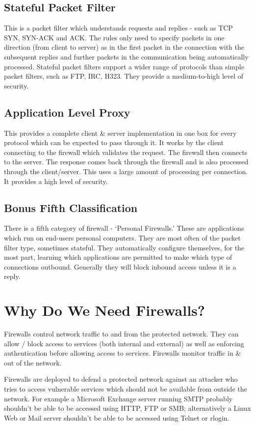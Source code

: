 \subsection{Stateful Packet Filter}
This is a packet filter which understands requests and replies - such as TCP SYN, SYN-ACK and ACK. The rules only need to specify packets in one direction (from client to server) as in the first packet in the connection with the subsequent replies and further packets in the communication being automatically processed. Stateful packet filters support a wider range of protocols than simple packet filters, such as FTP, IRC, H323. They provide a medium-to-high level of security.

\subsection{Application Level Proxy}
This provides a complete client \& server implementation in one box for every protocol which can be expected to pass through it. It works by the client connecting to the firewall which validates the request. The firewall then connects to the server. The response comes back through the firewall and is also processed through the client/server. This uses a large amount of processing per connection. It provides a high level of security. 

\subsection{Bonus Fifth Classification}
There is a fifth category of firewall - `Personal Firewalls.' These are applications which run on end-users personal computers. They are most often of the packet filter type, sometimes stateful. They automatically configure themselves, for the most part, learning which applications are permitted to make which type of connections outbound. Generally they will block inbound access unless it is a reply. 

\section{Why Do We Need Firewalls?}
Firewalls control network traffic to and from the protected network. They can allow / block access to services (both internal and external) as well as enforcing authentication before allowing access to services. Firewalls monitor traffic in \& out of the network.

Firewalls are deployed to defend a protected network against an attacker who tries to access vulnerable services which should not be available from outside the network. For example a Microsoft Exchange server running SMTP probably shouldn't be able to be accessed using HTTP, FTP or SMB; alternatively a Linux Web or Mail server shouldn't be able to be accessed using Telnet or rlogin. 

